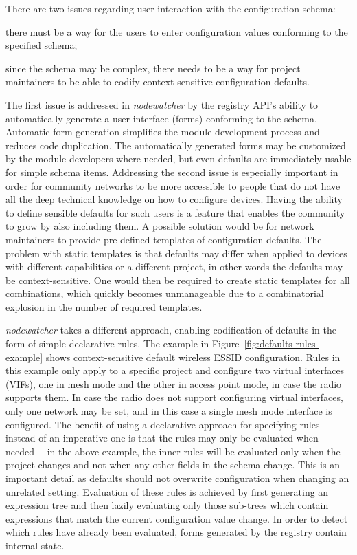 \documentclass[5p,sort&compress]{elsarticle}
\newcommand{\nodewatcher}{\textit{nodewatcher}}
\begin{document}
There are two issues regarding user interaction with the configuration schema:
\begin{enumerate*}[label=\itshape\alph*\upshape)]
\item there must be a way for the users to enter configuration values conforming to the specified schema;
\item since the schema may be complex, there needs to be a way for project maintainers to be able to codify context-sensitive configuration defaults.
\end{enumerate*}
The first issue is addressed in \nodewatcher{} by the registry API's ability to automatically generate a user interface (forms) conforming to the schema.
Automatic form generation simplifies the module development process and reduces code duplication.
The automatically generated forms may be customized by the module developers where needed, but even defaults are immediately usable for simple schema items.
Addressing the second issue is especially important in order for community networks to be more accessible to people that do not have all the deep technical knowledge on how to configure devices.
Having the ability to define sensible defaults for such users is a feature that enables the community to grow by also including them.
A possible solution would be for network maintainers to provide pre-defined templates of configuration defaults.
The problem with static templates is that defaults may differ when applied to devices with different capabilities or a different project, in other words the defaults may be context-sensitive.
One would then be required to create static templates for all combinations, which quickly becomes unmanageable due to a combinatorial explosion in the number of required templates.

\nodewatcher{} takes a different approach, enabling codification of defaults in the form of simple declarative rules.
The example in Figure~\ref{fig:defaults-rules-example} shows context-sensitive default wireless ESSID configuration.
Rules in this example only apply to a specific project and configure two virtual interfaces (VIFs), one in mesh mode and the other in access point mode, in case the radio supports them.
In case the radio does not support configuring virtual interfaces, only one network may be set, and in this case a single mesh mode interface is configured.
The benefit of using a declarative approach for specifying rules instead of an imperative one is that the rules may only be evaluated when needed~-- in the above example, the inner rules will be evaluated only when the project changes and not when any other fields in the schema change.
This is an important detail as defaults should not overwrite configuration when changing an unrelated setting.
Evaluation of these rules is achieved by first generating an expression tree and then lazily evaluating only those sub-trees which contain expressions that match the current configuration value change.
In order to detect which rules have already been evaluated, forms generated by the registry contain internal state.
\end{document}
